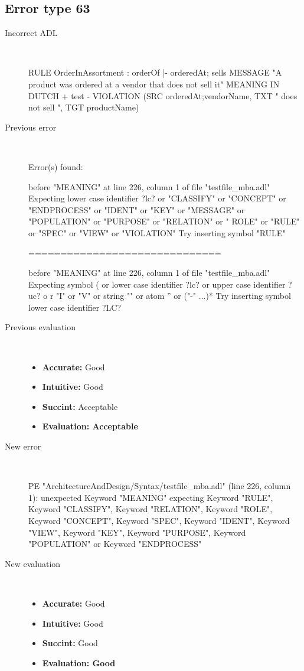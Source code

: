 \hrulefill

\subsection{Error type 63}
  \begin{description}
  \item[Incorrect ADL]~\\
\begin{adl}
RULE OrderInAssortment : orderOf |- orderedAt; sells 
MESSAGE "A product was ordered at a vendor that does not sell it"
MEANING IN DUTCH  {+ test -}
VIOLATION (SRC orderedAt;vendorName, TXT " does not sell ", TGT productName)
\end{adl}
  \item[Previous error]~\\
\begin{haskell}
Error(s) found:

before "MEANING" at line 226, column 1 of file "testfile_mba.adl"
Expecting lower case identifier ?lc? or "CLASSIFY" or "CONCEPT" or "ENDPROCESS"
or "IDENT" or "KEY" or "MESSAGE" or "POPULATION" or "PURPOSE" or "RELATION" or "
ROLE" or "RULE" or "SPEC" or "VIEW" or "VIOLATION"
Try inserting symbol "RULE"

==============================

before "MEANING" at line 226, column 1 of file "testfile_mba.adl"
Expecting symbol ( or lower case identifier ?lc? or upper case identifier ?uc? o
r "I" or "V" or string "" or atom '' or ("-" ...)*
Try inserting symbol lower case identifier ?LC?
\end{haskell}
  \item[Previous evaluation]~\\
    \begin{itemize}
    \item \textbf{Accurate:} Good
    \item \textbf{Intuitive:} Good
    \item \textbf{Succint:} Acceptable
    \item \textbf{Evaluation: Acceptable}
    \end{itemize}
  \item[New error]~\\
\begin{haskell}
PE "ArchitectureAndDesign/Syntax/testfile_mba.adl" (line 226, column 1):
unexpected Keyword "MEANING"
expecting Keyword "RULE", Keyword "CLASSIFY", Keyword "RELATION", Keyword "ROLE", Keyword "CONCEPT", Keyword "SPEC", Keyword "IDENT", Keyword "VIEW", Keyword "KEY", Keyword "PURPOSE", Keyword "POPULATION" or Keyword "ENDPROCESS"
\end{haskell}
  \item[New evaluation]~\\
    \begin{itemize}
    \item \textbf{Accurate:} Good
    \item \textbf{Intuitive:} Good
    \item \textbf{Succint:} Good
    \item \textbf{Evaluation: Good
}
    \end{itemize}
  \end{description}

